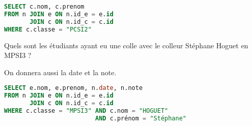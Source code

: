 \begin{Answer}
\begin{lstlisting}[language=SQL]
SELECT c.nom, c.prenom
FROM n JOIN e ON n.id_e = e.id
       JOIN c ON n.id_c = c.id
WHERE c.classe = "PCSI2"
\end{lstlisting}
\end{Answer}
\begin{Exercise}
Quels sont les étudiants ayant eu une colle avec le colleur Stéphane Hoguet en MPSI3 ? 

On donnera aussi la date et la note.
\end{Exercise}
\begin{Answer}
\begin{lstlisting}[language=SQL]
SELECT e.nom, e.prenom, n.date, n.note
FROM n JOIN e ON n.id_e = e.id
       JOIN c ON n.id_c = c.id
WHERE c.classe = "MPSI3" AND c.nom = "HOGUET" 
                         AND c.prénom = "Stéphane"
\end{lstlisting}
\newpage
\end{Answer}
